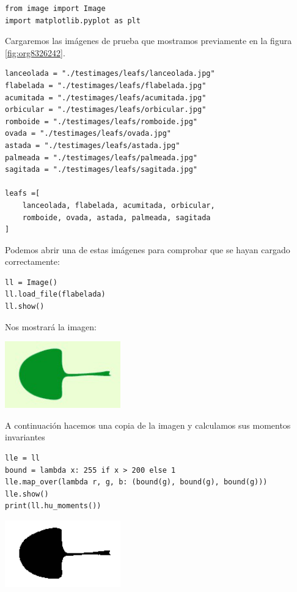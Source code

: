 \documentclass[letter]{article}
\begin{document}
\begin{verbatim}
from image import Image
import matplotlib.pyplot as plt
\end{verbatim}

Cargaremos las imágenes de prueba que mostramos previamente en la figura
\ref{fig:org8326242}.

\begin{verbatim}
lanceolada = "./testimages/leafs/lanceolada.jpg"
flabelada = "./testimages/leafs/flabelada.jpg"
acumitada = "./testimages/leafs/acumitada.jpg"
orbicular = "./testimages/leafs/orbicular.jpg"
romboide = "./testimages/leafs/romboide.jpg"
ovada = "./testimages/leafs/ovada.jpg"
astada = "./testimages/leafs/astada.jpg"
palmeada = "./testimages/leafs/palmeada.jpg"
sagitada = "./testimages/leafs/sagitada.jpg"

leafs =[
    lanceolada, flabelada, acumitada, orbicular,
    romboide, ovada, astada, palmeada, sagitada
]
\end{verbatim}

Podemos abrir una de estas imágenes para comprobar que se hayan cargado correctamente:

\begin{verbatim}
ll = Image()
ll.load_file(flabelada)
ll.show()
\end{verbatim}

Nos mostrará la imagen:

\begin{center}
\includegraphics[width=5cm]{./images/show.png}
\end{center}

A continuación hacemos una copia de la imagen y calculamos sus momentos invariantes

\begin{verbatim}
lle = ll
bound = lambda x: 255 if x > 200 else 1
lle.map_over(lambda r, g, b: (bound(g), bound(g), bound(g)))
lle.show()
print(ll.hu_moments())
\end{verbatim}

\begin{center}
\includegraphics[width=5cm]{./images/showbn.png}
\end{center}
\end{document}
